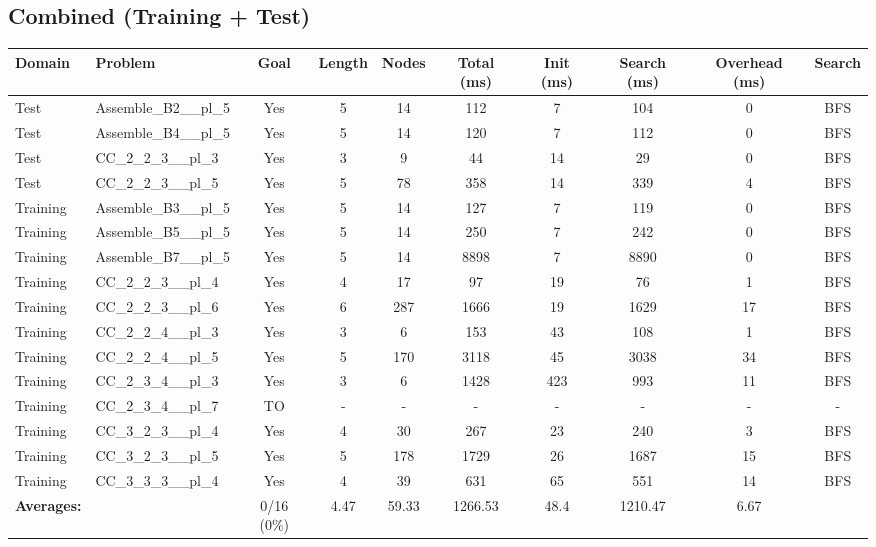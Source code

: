 \documentclass{article}
\begin{document}
\subsection*{Combined (Training + Test)}
\begin{tabular}{llcccccccc}
\toprule
Domain & Problem & Goal & Length & Nodes & Total (ms) & Init (ms) & Search (ms) & Overhead (ms) & Search \\
\midrule
Test & Assemble\_B2\_\_pl\_5 & Yes & 5 & 14 & 112 & 7 & 104 & 0 & BFS \\
Test & Assemble\_B4\_\_pl\_5 & Yes & 5 & 14 & 120 & 7 & 112 & 0 & BFS \\
Test & CC\_2\_2\_3\_\_pl\_3 & Yes & 3 & 9 & 44 & 14 & 29 & 0 & BFS \\
Test & CC\_2\_2\_3\_\_pl\_5 & Yes & 5 & 78 & 358 & 14 & 339 & 4 & BFS \\
Training & Assemble\_B3\_\_pl\_5 & Yes & 5 & 14 & 127 & 7 & 119 & 0 & BFS \\
Training & Assemble\_B5\_\_pl\_5 & Yes & 5 & 14 & 250 & 7 & 242 & 0 & BFS \\
Training & Assemble\_B7\_\_pl\_5 & Yes & 5 & 14 & 8898 & 7 & 8890 & 0 & BFS \\
Training & CC\_2\_2\_3\_\_pl\_4 & Yes & 4 & 17 & 97 & 19 & 76 & 1 & BFS \\
Training & CC\_2\_2\_3\_\_pl\_6 & Yes & 6 & 287 & 1666 & 19 & 1629 & 17 & BFS \\
Training & CC\_2\_2\_4\_\_pl\_3 & Yes & 3 & 6 & 153 & 43 & 108 & 1 & BFS \\
Training & CC\_2\_2\_4\_\_pl\_5 & Yes & 5 & 170 & 3118 & 45 & 3038 & 34 & BFS \\
Training & CC\_2\_3\_4\_\_pl\_3 & Yes & 3 & 6 & 1428 & 423 & 993 & 11 & BFS \\
Training & CC\_2\_3\_4\_\_pl\_7 & TO & - & - & - & - & - & - & - \\
Training & CC\_3\_2\_3\_\_pl\_4 & Yes & 4 & 30 & 267 & 23 & 240 & 3 & BFS \\
Training & CC\_3\_2\_3\_\_pl\_5 & Yes & 5 & 178 & 1729 & 26 & 1687 & 15 & BFS \\
Training & CC\_3\_3\_3\_\_pl\_4 & Yes & 4 & 39 & 631 & 65 & 551 & 14 & BFS \\
\textbf{Averages:} & & 0/16 (0\%) & 4.47 & 59.33 & 1266.53 & 48.4 & 1210.47 & 6.67 & \\
\bottomrule
\end{tabular}
\newpage
\end{document}
